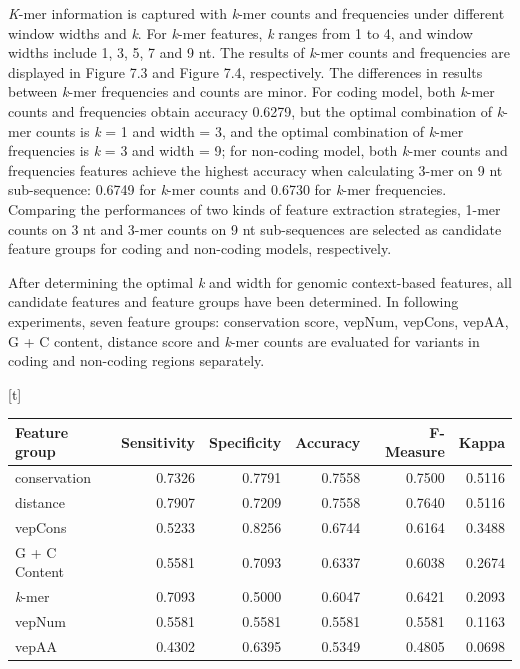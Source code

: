 \documentclass[a4paper,nohyper,nobib,openany,justified]{tufte-book}
\makeatletter
\renewenvironment{table}[1][htbp]{%
  \@tufte@orig@float{table}[#1]%
}{%
  \@tufte@orig@endfloat
}
\makeatother
\begin{document}
\begin{fullwidth}
\emph{K}-mer information is captured with \emph{k}-mer counts and frequencies under different window widths and \emph{k}. For \emph{k}-mer features, \emph{k} ranges from 1 to 4, and window widths include 1, 3, 5, 7 and 9 nt. The results of \emph{k}-mer counts and frequencies are displayed in Figure 7.3 and Figure 7.4, respectively. The differences in results between \emph{k}-mer frequencies and counts are minor. For coding model, both \emph{k}-mer counts and frequencies obtain accuracy 0.6279, but the optimal combination of \emph{k}-mer counts is \emph{k} = 1 and width = 3, and the optimal combination of \emph{k}-mer frequencies is \emph{k} = 3 and width = 9; for non-coding model, both \emph{k}-mer counts and frequencies features achieve the highest accuracy when calculating 3-mer on 9 nt sub-sequence: 0.6749 for \emph{k}-mer counts and 0.6730 for \emph{k}-mer frequencies. Comparing the performances of two kinds of feature extraction strategies, 1-mer counts on 3 nt and 3-mer counts on 9 nt sub-sequences are selected as candidate feature groups for coding and non-coding models, respectively.

After determining the optimal \emph{k} and width for genomic context-based features, all candidate features and feature groups have been determined. In following experiments, seven feature groups: conservation score, vepNum, vepCons, vepAA, G + C content, distance score and \emph{k}-mer counts are evaluated for variants in coding and non-coding regions separately.

\begin{table}[t]
  \begin{center}
    \footnotesize%
    \begin{tabular}{lrrrrr}
      \toprule
      Feature group & Sensitivity & Specificity & Accuracy & F-Measure & Kappa \\
      \midrule
      conservation       & 0.7326 & 0.7791 & 0.7558 & 0.7500 & 0.5116 \\
      distance           & 0.7907 & 0.7209 & 0.7558 & 0.7640 & 0.5116 \\
      vepCons   & 0.5233 & 0.8256 & 0.6744 & 0.6164 & 0.3488 \\
      G + C Content      & 0.5581 & 0.7093 & 0.6337 & 0.6038 & 0.2674 \\
      \emph{k}-mer              & 0.7093 & 0.5000 & 0.6047 & 0.6421 & 0.2093 \\
      vepNum & 0.5581 & 0.5581 & 0.5581 & 0.5581 & 0.1163 \\
      vepAA    & 0.4302 & 0.6395 & 0.5349 & 0.4805 & 0.0698 \\
      \bottomrule
    \end{tabular}
  \end{center}
  \caption{Performance of different feature groups evaluated on test set for coding region. Random forest classifier is built using training and validation set, and parameters are fine-tuned using 10-fold CV.}
  \label{tab:perf_fea_CD}
\end{table}


\end{fullwidth}
\end{document}
